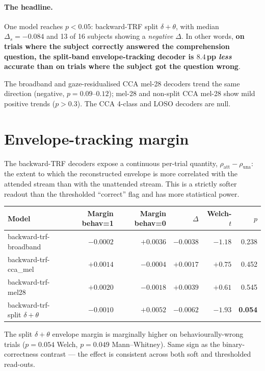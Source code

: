 \paragraph{The headline.}
One model reaches $p < 0.05$: backward-TRF split $\delta+\theta$, with
median $\Delta_s = -0.084$ and 13 of 16 subjects showing a
\emph{negative} $\Delta$. In other words, \textbf{on trials where the
subject correctly answered the comprehension question, the split-band
envelope-tracking decoder is $8.4$\,pp \emph{less} accurate than on
trials where the subject got the question wrong}.

The broadband and gaze-residualised CCA mel-28 decoders trend the same
direction (negative, $p = 0.09$--$0.12$); mel-28 and non-split CCA
mel-28 show mild positive trends ($p > 0.3$). The CCA 4-class and
LOSO decoders are null.

\section{Envelope-tracking margin}

The backward-TRF decoders expose a continuous per-trial quantity,
$\rho_{\text{att}} - \rho_{\text{una}}$: the extent to which the
reconstructed envelope is more correlated with the attended stream
than with the unattended stream. This is a strictly softer readout than
the thresholded ``correct'' flag and has more statistical power.

\begin{table}[ht]
\centering
\begin{tabular}{lrrrrr}
\toprule
Model & Margin behav=1 & Margin behav=0 & $\Delta$ & Welch-$t$ & $p$ \\
\midrule
backward-trf-broadband            & $-0.0002$ & $+0.0036$ & $-0.0038$ & $-1.18$ & 0.238 \\
backward-trf-cca\_mel             & $+0.0014$ & $-0.0004$ & $+0.0017$ & $+0.75$ & 0.452 \\
backward-trf-mel28                & $+0.0020$ & $-0.0018$ & $+0.0039$ & $+0.61$ & 0.545 \\
backward-trf-split $\delta+\theta$ & $-0.0010$ & $+0.0052$ & $-0.0062$ & $-1.93$ & \textbf{0.054} \\
\bottomrule
\end{tabular}
\end{table}

The split $\delta+\theta$ envelope margin is marginally higher on
behaviourally-wrong trials ($p = 0.054$ Welch, $p = 0.049$
Mann--Whitney). Same sign as the binary-correctness contrast --- the
effect is consistent across both soft and thresholded read-outs.

